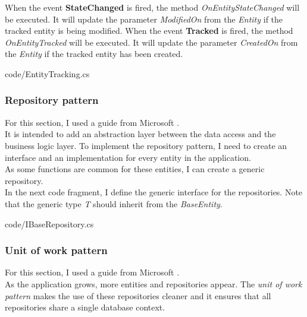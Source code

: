         When the event \textbf{StateChanged} is fired, the method \textit{OnEntityStateChanged} will be executed. It will update the parameter \textit{ModifiedOn} from the \textit{Entity} if the tracked entity is being modified.
        When the event \textbf{Tracked} is fired, the method \textit{OnEntityTracked} will be executed. It will update the parameter \textit{CreatedOn} from the \textit{Entity} if the tracked entity has been created.

            
            {code/EntityTracking.cs}
        
        \subsubsection{Repository pattern}
            For this section, I used a guide from Microsoft \cite{RepoAndUW}. \\
            It is intended to add an abstraction layer between the data access and the business logic layer. To implement the repository pattern, I need to create an interface and an implementation for every entity in the application. \\
            As some functions are common for these entities, I can create a generic repository. \\

            In the next code fragment, I define the generic interface for the repositories. Note that the generic type \textit{T} should inherit from the \textit{BaseEntity}.
            
            {code/IBaseRepository.cs}

        \subsubsection{Unit of work pattern}
            For this section, I used a guide from Microsoft \cite{RepoAndUW}. \\
            As the application grows, more entities and repositories appear. The \textit{unit of work pattern} makes the use of these repositories cleaner and it ensures that all repositories share a single database context. \\


